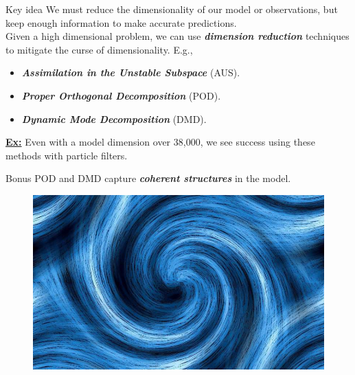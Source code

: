 \documentclass[aspectratio=169]{beamer}
\newcommand\boldgreen[1]{\textcolor{lighter_csu_green}{\emph{\textbf{#1}}}}
\begin{document}
\begin{frame}{Key idea}
\vfill
We must reduce the dimensionality of our model or observations, but keep enough information to make accurate predictions.\\

\pause Given a high dimensional problem, we can use \boldgreen{dimension reduction} techniques to mitigate the curse of dimensionality. E.g.,
\begin{itemize}
    \item \boldgreen{Assimilation in the Unstable Subspace} (AUS).
    \item \boldgreen{Proper Orthogonal Decomposition} (POD).
    \item \boldgreen{Dynamic Mode Decomposition} (DMD).
\end{itemize}
\pause \textbf{\underline{Ex:}} Even with a model dimension over 38,000, we see success using these methods with particle filters.
\vfill 
\end{frame}


\begin{frame}{Bonus}
\vfill
    POD and DMD capture \boldgreen{coherent structures} in the model.
    \begin{figure}[H]
        \centering
        \includegraphics[width=.6\textwidth]{figures/coherent_structure.jpg}
    \end{figure}
\vfill
\end{frame}

\end{document}
